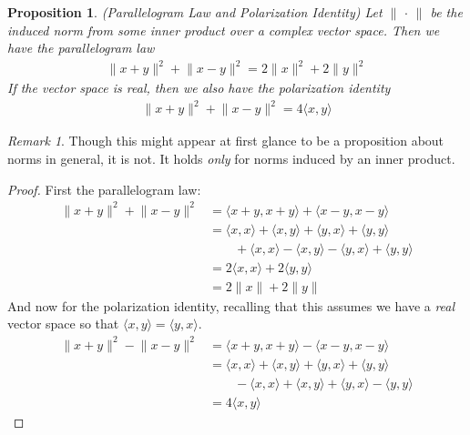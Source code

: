 \documentclass[12pt]{article}
\numberwithin{equation}{section} %
\theoremstyle{plain}
\newtheorem{prop}[thm]{Proposition}
\theoremstyle{definition}
\theoremstyle{remark}
\newtheorem*{rmk}{Remark}
\begin{document}
\begin{prop}\emph{(Parallelogram Law and Polarization Identity)}
Let $\lVert\,\cdot\,\rVert$ be the induced norm from some inner product
over a complex vector space.
Then we have the \emph{parallelogram law}
\begin{align*}
  \lVert x+y\rVert^2 +
  \lVert x-y\rVert^2 =
  2\lVert x \rVert^2
  + 2\lVert y \rVert^2
\end{align*}
If the vector space is \emph{real}, then we also have the
\emph{polarization identity}
\begin{align*}
  \lVert x+y\rVert^2 +
  \lVert x-y\rVert^2 = 4\langle x,y \rangle
\end{align*}
\end{prop}
\begin{rmk}
Though this might appear at first glance to be a proposition about norms
in general, it is not. It holds \emph{only} for norms induced by an
inner product.
\end{rmk}
\begin{proof}
First the parallelogram law:
\begin{align*}
  \lVert x+y\rVert^2 +
  \lVert x-y\rVert^2
  &=
  \langle x+y, x+y\rangle
  + \langle x-y, x-y\rangle \\
  &=
  \langle x, x\rangle
  + \langle x, y\rangle
  + \langle y, x\rangle
  + \langle y, y\rangle \\
  &\qquad
  + \langle x, x\rangle
  - \langle x, y\rangle
  - \langle y, x\rangle
  + \langle y, y\rangle \\
  &=
  2\langle x, x\rangle
  + 2\langle y, y\rangle \\
  &=
  2\lVert x\rVert
  + 2\lVert y\rVert
\end{align*}
And now for the polarization identity, recalling that this assumes we
have a \emph{real} vector space so that
$\langle x,y\rangle = \langle y,x\rangle$.
\begin{align*}
  \lVert x+y\rVert^2 -
  \lVert x-y\rVert^2
  &=
  \langle x+y, x+y\rangle
  - \langle x-y, x-y\rangle \\
  &=
  \langle x, x\rangle
  + \langle x, y\rangle
  + \langle y, x\rangle
  + \langle y, y\rangle \\
  &\qquad
  - \langle x, x\rangle
  + \langle x, y\rangle
  + \langle y, x\rangle
  - \langle y, y\rangle \\
  &=
  4\langle x, y\rangle
\end{align*}

\end{proof}
\end{document}
